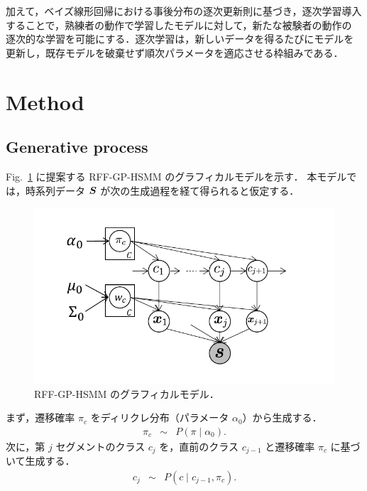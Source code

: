 \documentclass[conference]{IEEEtran}
\begin{document}
加えて，ベイズ線形回帰における事後分布の逐次更新則に基づき，逐次学習\cite{Broderick2013}導入することで，熟練者の動作で学習したモデルに対して，新たな被験者の動作の
逐次的な学習を可能にする．逐次学習は，新しいデータを得るたびにモデルを更新し，既存モデルを破棄せず順次パラメータを適応させる枠組みである．
\section{Method}

\subsection{Generative process}\label{AA}
Fig.~\ref{fig:model} に提案する RFF-GP-HSMM のグラフィカルモデルを示す．  
本モデルでは，時系列データ ${ \boldsymbol S}$ が次の生成過程を経て得られると仮定する．

\begin{figure}[t]
  \begin{center}
    \includegraphics[scale=0.6]{fig/model.pdf}
    \caption{RFF-GP-HSMM のグラフィカルモデル．}
    \label{fig:model}
  \end{center}
  \vspace{-0.4cm}
\end{figure}

まず，遷移確率 $\pi_c$ をディリクレ分布（パラメータ $\alpha_0$）から生成する．
%
\begin{eqnarray}
\pi_c &\sim& P(\pi \mid \alpha_0).
\end{eqnarray}
%
次に，第 $j$ セグメントのクラス $c_j$ を，直前のクラス $c_{j-1}$ と遷移確率 $\pi_c$ に基づいて生成する．
%
\begin{eqnarray}
c_j &\sim& P(c \mid c_{j-1}, \pi_c).
\end{eqnarray}
%
\end{document}
